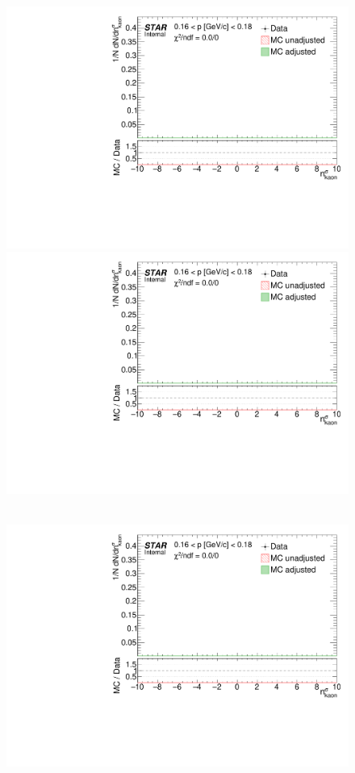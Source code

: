 \begin{figure}[ht]
{  \includegraphics[width=\linewidth,page=12]{graphics/dedx/nSigmaKaon_DataVsMC.pdf}\\[3pt]
  \includegraphics[width=\linewidth,page=14]{graphics/dedx/nSigmaKaon_DataVsMC.pdf}
}~
\parbox{0.495\textwidth}{
  \centering
  \includegraphics[width=\linewidth,page=9]{graphics/dedx/nSigmaKaon_DataVsMC.pdf}\\[3pt]
}
\end{figure}
